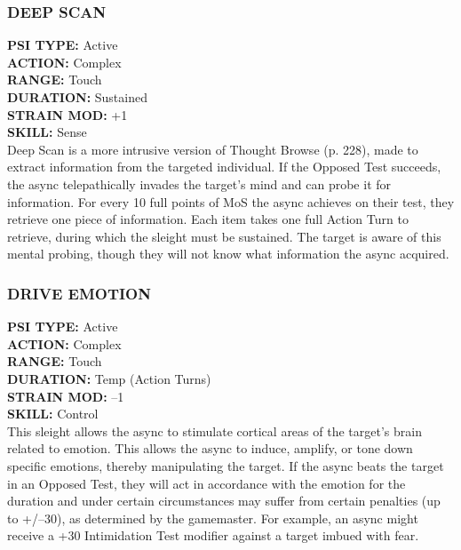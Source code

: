 \subsubsection{DEEP SCAN} \textbf{PSI TYPE:} Active \\ \textbf{ACTION:} Complex \\ \textbf{RANGE:} Touch \\ \textbf{DURATION:} Sustained \\ \textbf{STRAIN MOD:} +1 \\ \textbf{SKILL:} Sense\\ Deep Scan is a more intrusive version of Thought Browse (p. 228), made to extract information from the targeted individual. If the Opposed Test succeeds, the async telepathically invades the target’s mind and can probe it for information. For every 10 full points of MoS the async achieves on their test, they retrieve one piece of information. Each item takes one full Action Turn to retrieve, during which the sleight must be sustained. The target is aware of this mental probing, though they will not know what information the async acquired. 

\subsubsection{DRIVE EMOTION} \textbf{PSI TYPE:} Active \\ \textbf{ACTION:} Complex \\ \textbf{RANGE:} Touch \\ \textbf{DURATION:} Temp (Action Turns) \\ \textbf{STRAIN MOD:} –1 \\ \textbf{SKILL:} Control\\ This sleight allows the async to stimulate cortical areas of the target’s brain related to emotion. This allows the async to induce, amplify, or tone down specific emotions, thereby manipulating the target. If the async beats the target in an Opposed Test, they will act in accordance with the emotion for the duration and under certain circumstances may suffer from certain penalties (up to +/–30), as determined by the gamemaster. For example, an async might receive a +30 Intimidation Test modifier against a target imbued with fear. 

